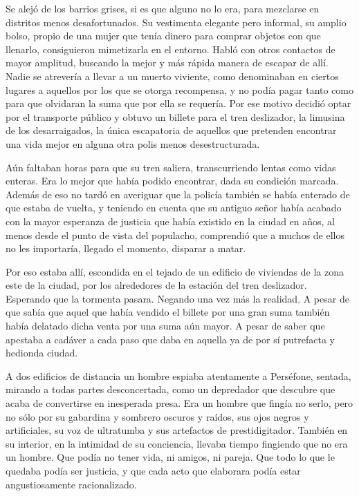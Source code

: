 Se alejó de los barrios grises, si es que alguno no lo era, para mezclarse en distritos menos desafortunados. Su vestimenta elegante pero informal, su amplio bolso, propio de una mujer que tenía dinero para comprar objetos con que llenarlo, consiguieron mimetizarla en el entorno. Habló con otros contactos de mayor amplitud, buscando la mejor y más rápida manera de escapar de allí. Nadie se atrevería a llevar a un muerto viviente, como denominaban en ciertos lugares a aquellos por los que se otorga recompensa, y no podía pagar tanto como para que olvidaran la suma que por ella se requería. Por ese motivo decidió optar por el transporte público y obtuvo un billete para el tren deslizador, la limusina de los desarraigados, la única escapatoria de aquellos que pretenden encontrar una vida mejor en alguna otra polis menos desestructurada.

Aún faltaban horas para que su tren saliera, transcurriendo lentas como vidas enteras. Era lo mejor que había podido encontrar, dada su condición marcada. Además de eso no tardó en averiguar que la policía también se había enterado de que estaba de vuelta, y teniendo en cuenta que su antiguo señor había acabado con la mayor esperanza de justicia que había existido en la ciudad en años, al menos desde el punto de vista del populacho, comprendió que a muchos de ellos no les importaría, llegado el momento, disparar a matar.

Por eso estaba allí, escondida en el tejado de un edificio de viviendas de la zona este de la ciudad, por los alrededores de la estación del tren deslizador. Esperando que la tormenta pasara. Negando una vez más la realidad. A pesar de que sabía que aquel que  había vendido el billete por una gran suma también había delatado dicha venta por una suma aún mayor. A pesar de saber que apestaba a cadáver a cada paso que daba en aquella ya de por sí putrefacta y hedionda ciudad.

A dos edificios de distancia un hombre espiaba atentamente a Perséfone, sentada, mirando a todas partes desconcertada, como un depredador que descubre que acaba de convertirse en inesperada presa. Era un hombre que fingía no serlo, pero no sólo por su gabardina y sombrero oscuros y raídos, sus ojos negros y artificiales, su voz de ultratumba y sus artefactos de prestidigitador. También en su interior, en la intimidad de su conciencia, llevaba tiempo fingiendo que no era un hombre. Que podía no tener vida, ni amigos, ni pareja. Que todo lo que le quedaba podía ser justicia, y que cada acto que elaborara podía estar angustiosamente racionalizado.

